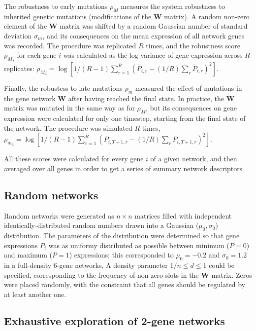 \documentclass[a4paper]{article}
\newcommand{\earlymut}{{\rho_M}}
\newcommand{\latemut}{{\rho_m}}
\begin{document}
The robustness to early mutations $\earlymut$ measures the system robustness to inherited genetic mutations (modifications of the $\bm W$ matrix). A random non-zero element of the $\bm W$ matrix was shifted by a random Gaussian number of standard deviation $\sigma_m$, and its consequences on the mean expression of all network genes was recorded. The procedure was replicated $R$ times, and the robustness score $\earlymut_i$ for each gene $i$ was calculated as the log variance of gene expression across $R$ replicates: $\earlymut_i = \log[ 1/(R-1) \sum_{r=1}^R (\bar P_{i,r} - (1/R)\sum_r \bar P_{i,r})^2]$. 

Finally, the robustess to late mutations $\latemut$ measured the effect of mutations in the gene network $\bm W$ after having reached the final state. In practice, the $\bm W$ matrix was mutated in the same way as for $\earlymut$, but its consequences on gene expression were calculated for only one timestep, starting from the final state of the network. The procedure was simulated $R$ times, $\latemut_i = \log[ 1/(R-1) \sum_{r=1}^R (P_{i,T+1,r} - (1/R) \sum_r P_{i,T+1,r})^2 ]$.

All these scores were calculated for every gene $i$ of a given network, and then averaged over all genes in order to get a series of summary network descriptors 

\subsection{Random networks}

Random networks were generated as $n\times n$ matrices filled with independent identically-distributed random numbers drawn into a Gaussian ($\mu_0, \sigma_0$) distribution. The parameters of the distribution were determined so that gene expressions $P_i$ was as uniformy distributed as possible between minimum ($P=0$) and maximum ($P=1$) expressions; this corresponded to $\mu_0=-0.2$ and $\sigma_0=1.2$ in a full-density 6-gene networks, A density parameter $1/n \leq d \leq 1$ could be specified, corresponding to the frequency of non-zero slots in the $\bm W$ matrix. Zeros were placed randomly, with the constraint that all genes should be regulated by at least another one. 

\subsection{Exhaustive exploration of 2-gene networks}
\end{document}
